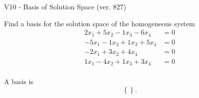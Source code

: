 \begin{exercise}
  \begin{exerciseTitle}V10 - Basis of Solution Space (ver. 827)\end{exerciseTitle}
  \begin{exerciseStatement}
    Find a basis for the solution space of the homogeneous system 
\begin{align*}
 2 x_ 1 + 5 x_ 2 -1 x_ 3 -6 x_ 4 &= 0  \\ 
  -5 x_ 1 -1 x_ 2 + 1 x_ 3 + 5 x_ 4 &= 0  \\ 
  -2 x_ 1 + 3 x_ 2 + 4 x_ 4 &= 0  \\ 
  1 x_ 1 -4 x_ 2 + 1 x_ 3 + 3 x_ 4 &= 0  \\ 
 \end{align*}


 
  \end{exerciseStatement}

  \begin{exerciseAnswer}
   A basis is   
\[\left\{\right\}.\]

  


  \end{exerciseAnswer}
\end{exercise}